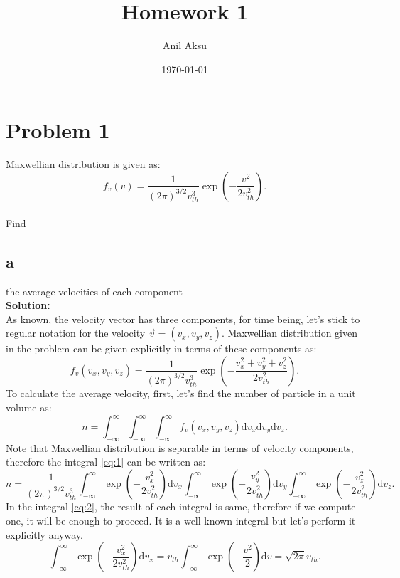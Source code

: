 \documentclass[11pt]{amsart}
\title{Homework 1}
\author{Anil Aksu}
\date{\today}
\begin{document}
\maketitle

\section*{Problem 1 }

Maxwellian distribution is given as: 
\begin{equation*}
f_v(v)=\frac{1}{(2 \pi)^{3/2}v_{th}^3}\exp(-\frac{v^2}{2 v_{th}^2}).
\end{equation*}
\\
Find
\subsection*{a}
the average velocities of each component
\\
\textbf{Solution:}\\
As known, the velocity vector has three components, for time being, let's stick to regular notation for the velocity $\vec{v}=(v_x,v_y,v_z)$. Maxwellian distribution given in the problem can be given explicitly in terms of these components as:
\begin{equation}
f_v(v_x,v_y,v_z)=\frac{1}{(2 \pi)^{3/2}v_{th}^3}\exp(-\frac{v_{x}^2+v_{y}^2+v_{z}^2}{2 v_{th}^2}).
\end{equation}
To calculate the average velocity, first, let's find the number of particle in a unit volume as:
\begin{equation}
\label{eq:1}
n=\int_{-\infty}^{\infty}\int_{-\infty}^{\infty}\int_{-\infty}^{\infty}f_v(v_x,v_y,v_z)\mathrm{d}v_x\mathrm{d}v_y\mathrm{d}v_z.
\end{equation}
Note that Maxwellian distribution is separable in terms of velocity components, therefore the integral \ref{eq:1} can be written as:
\begin{equation}
\label{eq:2}
n=\frac{1}{(2 \pi)^{3/2}v_{th}^3}\int_{-\infty}^{\infty}\exp(-\frac{v_{x}^2}{2 v_{th}^2})\mathrm{d}v_x\int_{-\infty}^{\infty}\exp(-\frac{v_{y}^2}{2 v_{th}^2})\mathrm{d}v_y\int_{-\infty}^{\infty}\exp(-\frac{v_{z}^2}{2 v_{th}^2})\mathrm{d}v_z.
\end{equation}
In the integral \ref{eq:2}, the result of each integral is same, therefore if we compute one, it will be enough to proceed. It is a well known integral but let's perform it explicitly anyway.
\begin{equation}
\int_{-\infty}^{\infty}\exp(-\frac{v_{x}^2}{2 v_{th}^2})\mathrm{d}v_x=v_{th}\int_{-\infty}^{\infty}\exp(-\frac{v^2}{2})\mathrm{d}v=\sqrt{2 \pi}v_{th}.
\end{equation}
\end{document}
